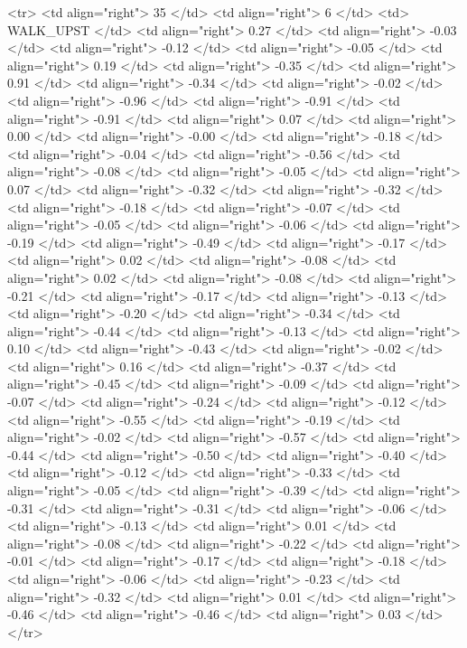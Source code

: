   <tr> <td align="right"> 35 </td> <td align="right">   6 </td> <td> WALK_UPST </td> <td align="right"> 0.27 </td> <td align="right"> -0.03 </td> <td align="right"> -0.12 </td> <td align="right"> -0.05 </td> <td align="right"> 0.19 </td> <td align="right"> -0.35 </td> <td align="right"> 0.91 </td> <td align="right"> -0.34 </td> <td align="right"> -0.02 </td> <td align="right"> -0.96 </td> <td align="right"> -0.91 </td> <td align="right"> -0.91 </td> <td align="right"> 0.07 </td> <td align="right"> 0.00 </td> <td align="right"> -0.00 </td> <td align="right"> -0.18 </td> <td align="right"> -0.04 </td> <td align="right"> -0.56 </td> <td align="right"> -0.08 </td> <td align="right"> -0.05 </td> <td align="right"> 0.07 </td> <td align="right"> -0.32 </td> <td align="right"> -0.32 </td> <td align="right"> -0.18 </td> <td align="right"> -0.07 </td> <td align="right"> -0.05 </td> <td align="right"> -0.06 </td> <td align="right"> -0.19 </td> <td align="right"> -0.49 </td> <td align="right"> -0.17 </td> <td align="right"> 0.02 </td> <td align="right"> -0.08 </td> <td align="right"> 0.02 </td> <td align="right"> -0.08 </td> <td align="right"> -0.21 </td> <td align="right"> -0.17 </td> <td align="right"> -0.13 </td> <td align="right"> -0.20 </td> <td align="right"> -0.34 </td> <td align="right"> -0.44 </td> <td align="right"> -0.13 </td> <td align="right"> 0.10 </td> <td align="right"> -0.43 </td> <td align="right"> -0.02 </td> <td align="right"> 0.16 </td> <td align="right"> -0.37 </td> <td align="right"> -0.45 </td> <td align="right"> -0.09 </td> <td align="right"> -0.07 </td> <td align="right"> -0.24 </td> <td align="right"> -0.12 </td> <td align="right"> -0.55 </td> <td align="right"> -0.19 </td> <td align="right"> -0.02 </td> <td align="right"> -0.57 </td> <td align="right"> -0.44 </td> <td align="right"> -0.50 </td> <td align="right"> -0.40 </td> <td align="right"> -0.12 </td> <td align="right"> -0.33 </td> <td align="right"> -0.05 </td> <td align="right"> -0.39 </td> <td align="right"> -0.31 </td> <td align="right"> -0.31 </td> <td align="right"> -0.06 </td> <td align="right"> -0.13 </td> <td align="right"> 0.01 </td> <td align="right"> -0.08 </td> <td align="right"> -0.22 </td> <td align="right"> -0.01 </td> <td align="right"> -0.17 </td> <td align="right"> -0.18 </td> <td align="right"> -0.06 </td> <td align="right"> -0.23 </td> <td align="right"> -0.32 </td> <td align="right"> 0.01 </td> <td align="right"> -0.46 </td> <td align="right"> -0.46 </td> <td align="right"> 0.03 </td> </tr>
